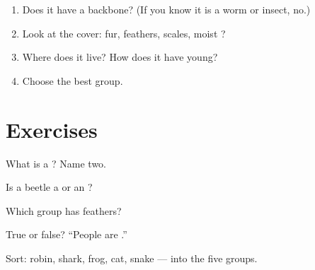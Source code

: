 \begin{method}\label{met:g2:animal-groups:sort}
\begin{enumerate}
  \item Does it have a backbone? (If you know it is a worm or
        insect, no.)
  \item Look at the cover: fur, feathers, scales, moist ?
  \item Where does it live? How does it have young?
  \item Choose the best group.
\end{enumerate}
\end{method}

\section{Exercises}

\begin{exercise}[$\star$]\label{exo:g2:animal-groups:1}
What is a ? Name two.
\end{exercise}

\begin{exercise}[$\star$]\label{exo:g2:animal-groups:2}
Is a beetle a  or an ?
\end{exercise}

\begin{exercise}[$\star$]\label{exo:g2:animal-groups:3}
Which group has feathers?
\end{exercise}

\begin{exercise}[$\star$]\label{exo:g2:animal-groups:4}
True or false? ``People are .''
\end{exercise}

\begin{exercise}[$\star\star$]\label{exo:g2:animal-groups:5}
Sort: robin, shark, frog, cat, snake --- into the five 
groups.
\end{exercise}


